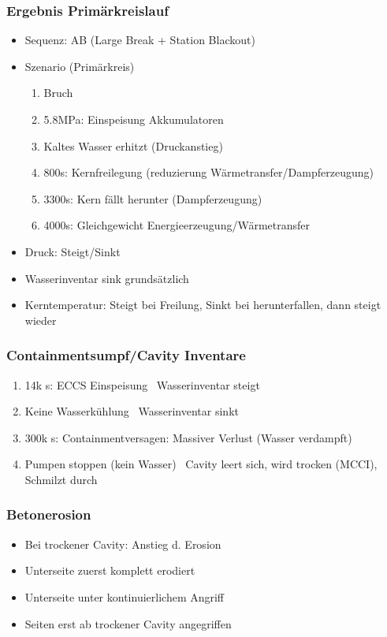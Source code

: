 \documentclass[12pt]{article}
\begin{document}
\subsubsection{Ergebnis Primärkreislauf}
\begin{itemize}
  \item Sequenz: AB (Large Break + Station Blackout)
  \item Szenario (Primärkreis)
  \begin{enumerate}
    \item Bruch
    \item 5.8MPa: Einspeisung Akkumulatoren
    \item Kaltes Wasser erhitzt (Druckanstieg)
    \item 800s: Kernfreilegung (reduzierung Wärmetransfer/Dampferzeugung)
    \item 3300s: Kern fällt herunter (Dampferzeugung)
    \item 4000s: Gleichgewicht Energieerzeugung/Wärmetransfer
  \end{enumerate}
  \item Druck: Steigt/Sinkt
  \item Wasserinventar sink grundsätzlich
  \item Kerntemperatur: Steigt bei Freilung, Sinkt bei herunterfallen, dann steigt wieder
\end{itemize}

\subsubsection{Containmentsumpf/Cavity Inventare}
\begin{enumerate}
  \item 14k s: ECCS Einspeisung \textrightarrow\ Wasserinventar steigt
  \item Keine Wasserkühlung \textrightarrow\ Wasserinventar sinkt
  \item 300k s: Containmentversagen: Massiver Verlust (Wasser verdampft)
  \item Pumpen stoppen (kein Wasser) \textrightarrow\ Cavity leert sich, wird trocken (MCCI), Schmilzt durch
\end{enumerate}

\subsubsection{Betonerosion}
\begin{itemize}
  \item Bei trockener Cavity: Anstieg d. Erosion
  \item Unterseite zuerst komplett erodiert
  \item Unterseite unter kontinuierlichem Angriff 
  \item Seiten erst ab trockener Cavity angegriffen
\end{itemize}
\end{document}
